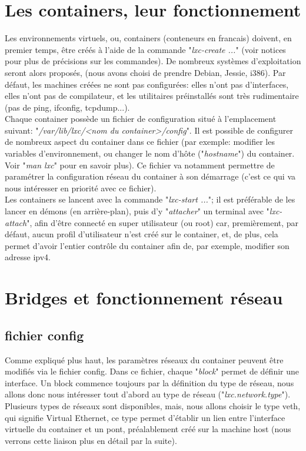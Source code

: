\documentclass{article}
\begin{document}
\section{Les containers, leur fonctionnement}
Les environnements virtuels, ou, containers (conteneurs en francais)  doivent, en premier temps, \^etre cr\'e\'es
\`a l'aide de la commande "\emph{lxc-create ...}" (voir notices pour plus de pr\'ecisions sur les commandes). De
nombreux syst\`emes d'exploitation seront alors propos\'es, (nous avons choisi de prendre Debian, Jessie,
i386). Par d\'efaut, les machines cr\'e\'ees ne sont pas configur\'ees: elles n'ont pas d'interfaces, elles 
n'ont pas de compilateur, et les utilitaires pr\'einstall\'es sont tr\`es rudimentaire (pas de ping, ifconfig, tcpdump...).\\

Chaque container poss\`ede un fichier de configuration situ\'e \`a l'emplacement suivant: "\emph{/var/lib/lxc/<nom du container>/config}".
Il est possible de configurer de nombreux aspect du container dans ce fichier (par exemple: modifier
les variables d'environnement, ou changer le nom d'h\^ote ("\emph{hostname}") du container. Voir "\emph{man lxc}"
pour en savoir plus). Ce fichier va notamment permettre de param\'etrer la configuration r\'eseau du container
\`a son d\'emarrage (c'est ce qui va nous int\'eresser en priorit\'e avec ce fichier).\\

Les containers se lancent avec la commande "\emph{lxc-start ...}"; il est pr\'ef\'erable de les lancer en d\'emons
(en arri\`ere-plan), puis d'y "\emph{attacher}" un terminal avec "\emph{lxc-attach}", afin d'\^etre connect\'e en super
utilisateur (ou root) car, premi\`erement, par d\'efaut, aucun profil d'utilisateur n'est cr\'e\'e sur le container,
et, de plus, cela permet d'avoir l'entier contr\^ole du container afin de, par exemple, modifier son adresse ipv4.\\


\section{Bridges et fonctionnement r\'eseau}
\subsection{fichier config}
Comme expliqu\'e plus haut, les param\`etres r\'eseaux du container peuvent \^etre modifi\'es via le fichier config.
Dans ce fichier, chaque "\emph{block}" permet de d\'efinir une interface. Un block commence toujours par la 
d\'efinition du type de r\'eseau, nous allons donc nous int\'eresser tout d'abord au type de r\'eseau ("\emph{lxc.network.type}").
Plusieurs types de r\'eseaux sont disponibles, mais, nous allons choisir le type veth, qui signifie Virtual 
Ethernet, ce type permet d'\'etablir un lien entre l'interface virtuelle du container et un pont, pr\'ealablement
cr\'e\'e sur la machine host (nous verrons cette liaison plus en d\'etail par la suite).\\
\end{document}
